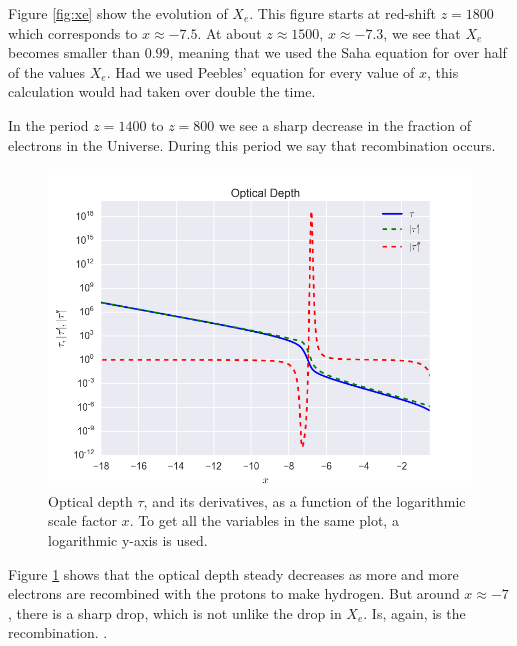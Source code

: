 \documentclass[a4paper,norsk, 10pt]{article}
\begin{document}
Figure \ref{fig:xe} show the evolution of $X_e$. This figure starts at red-shift $z=1800$ which corresponds to $x\approx -7.5$. At about $z\approx 1500$, $x\approx -7.3$, we see that $X_e$ becomes smaller than $0.99$, meaning that we used the Saha equation for over half of the values $X_e$. Had we used Peebles' equation for every value of $x$, this calculation would had taken over double the time.

In the period $z = 1400$ to $z = 800$ we see a sharp decrease in the fraction of electrons in the Universe. During this period we say that recombination occurs.

\begin{figure}[!htb]
\centering
\includegraphics[scale=0.5]{tau.png}
\caption{Optical depth $\tau$, and its derivatives, as a function of the logarithmic scale factor $x$. To get all the variables in the same plot, a logarithmic y-axis is used.}\label{fig:tau}
\end{figure}

Figure \ref{fig:tau} shows that the optical depth steady decreases as more and more electrons are recombined with the protons to make hydrogen. But around $x\approx -7$, there is a sharp drop, which is not unlike the drop in $X_e$. Is, again, is the recombination. .
\end{document}
